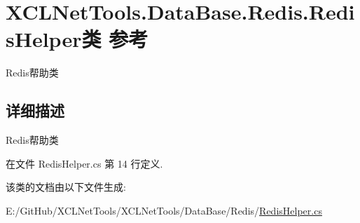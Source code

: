 \hypertarget{class_x_c_l_net_tools_1_1_data_base_1_1_redis_1_1_redis_helper}{}\section{X\+C\+L\+Net\+Tools.\+Data\+Base.\+Redis.\+Redis\+Helper类 参考}
\label{class_x_c_l_net_tools_1_1_data_base_1_1_redis_1_1_redis_helper}


Redis帮助类  




\subsection{详细描述}
Redis帮助类 



在文件 Redis\+Helper.\+cs 第 14 行定义.



该类的文档由以下文件生成\+:\begin{DoxyCompactItemize}
\item 
E\+:/\+Git\+Hub/\+X\+C\+L\+Net\+Tools/\+X\+C\+L\+Net\+Tools/\+Data\+Base/\+Redis/\hyperlink{_redis_helper_8cs}{Redis\+Helper.\+cs}\end{DoxyCompactItemize}
